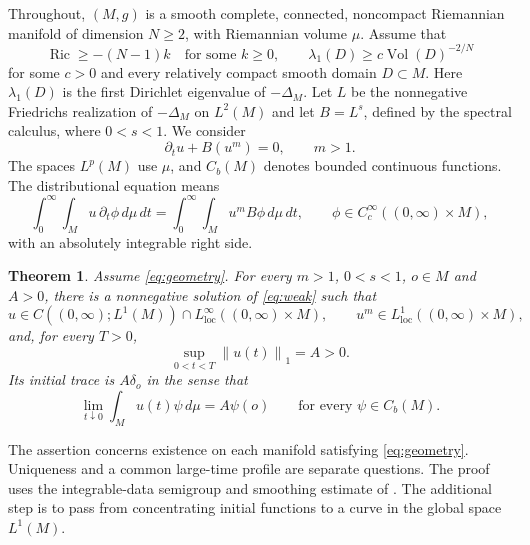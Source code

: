 \documentclass[11pt]{article}
\newtheorem{theorem}{Theorem}[section]
\theoremstyle{remark}
\newcommand{\dd}{\,d\mu}
\newcommand{\norm}[1]{\left\lVert#1\right\rVert}
\DeclareMathOperator{\Ric}{Ric}
\DeclareMathOperator{\Vol}{Vol}
\begin{document}
Throughout, $(M,g)$ is a smooth complete, connected, noncompact Riemannian
manifold of dimension $N\ge2$, with Riemannian volume $\mu$. Assume that
\begin{equation}\label{eq:geometry}
 \Ric\ge-(N-1)k\quad\text{for some }k\ge0,
 \qquad \lambda_1(D)\ge c\Vol(D)^{-2/N}
\end{equation}
for some $c>0$ and every relatively compact smooth domain $D\subset M$.
Here $\lambda_1(D)$ is the first Dirichlet eigenvalue of $-\Delta_M$.
Let $L$ be the nonnegative Friedrichs realization of $-\Delta_M$ on
$L^2(M)$ and let $B=L^s$, defined by the spectral calculus, where $0<s<1$.
We consider
\begin{equation}\label{eq:pde}
 \partial_tu+B(u^m)=0,\qquad m>1.
\end{equation}
The spaces $L^p(M)$ use $\mu$, and $C_b(M)$ denotes bounded continuous
functions. The distributional equation means
\begin{equation}\label{eq:weak}
 \int_0^\infty\!\int_M u\,\partial_t\phi\dd\,dt
 =\int_0^\infty\!\int_M u^m B\phi\dd\,dt,
 \qquad \phi\in C_c^\infty((0,\infty)\times M),
\end{equation}
with an absolutely integrable right side.

\begin{theorem}\label{thm:main}
Assume \eqref{eq:geometry}. For every $m>1$, $0<s<1$, $o\in M$ and
$A>0$, there is a nonnegative solution of \eqref{eq:weak} such that
\begin{equation}\label{eq:regularity}
 u\in C((0,\infty);L^1(M))\cap L^\infty_{\mathrm{loc}}((0,\infty)\times M),
 \qquad u^m\in L^1_{\mathrm{loc}}((0,\infty)\times M),
\end{equation}
and, for every $T>0$,
\begin{equation}\label{eq:mass}
 \sup_{0<t<T}\norm{u(t)}_1=A>0.
\end{equation}
Its initial trace is $A\delta_o$ in the sense that
\begin{equation}\label{eq:trace}
 \lim_{t\downarrow0}\int_Mu(t)\psi\dd=A\psi(o)
 \qquad\text{for every }\psi\in C_b(M).
\end{equation}
\end{theorem}

The assertion concerns existence on each manifold satisfying
\eqref{eq:geometry}. Uniqueness and a common large-time profile are separate
questions. The proof uses the integrable-data semigroup and smoothing
estimate of \cite{BBGM}. The additional step is to pass from concentrating
initial functions to a curve in the global space $L^1(M)$.
\end{document}
